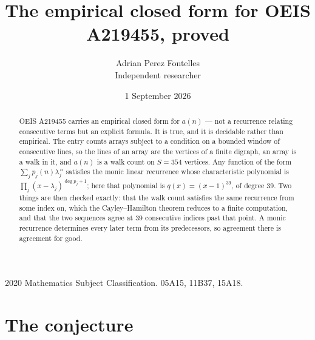 \documentclass[11pt,a4paper]{article}
\title{The empirical closed form for OEIS A219455, proved}
\author{Adrian Perez Fontelles\\ \small Independent researcher}
\date{1 September 2026}
\theoremstyle{plain}
\theoremstyle{definition}
\begin{document}
\maketitle

\begin{abstract}
OEIS A219455 carries an empirical closed form for $a(n)$ --- not a recurrence relating
consecutive terms but an explicit formula. It is true, and it is decidable rather than
empirical. The entry counts arrays subject to a condition on a bounded window of consecutive lines, so the lines of an array are the
vertices of a finite digraph, an array is a walk in it, and $a(n)$ is a walk count on
$S=354$ vertices. Any function of the form $\sum_j p_j(n)\lambda_j^{\,n}$ satisfies the
monic linear recurrence whose characteristic polynomial is
$\prod_j(x-\lambda_j)^{\deg p_j+1}$; here that polynomial is $q(x)=(x-1)^{39}$, of degree
$39$. Two things are then checked exactly: that the walk count satisfies the same
recurrence from some index on, which the Cayley--Hamilton theorem reduces to a finite
computation, and that the two sequences agree at $39$ consecutive indices past that
point. A monic recurrence determines every later term from its predecessors, so agreement
there is agreement for good.
\end{abstract}

\noindent\small 2020 Mathematics Subject Classification. 05A15, 11B37, 15A18.\normalsize

\section{The conjecture}
\end{document}
